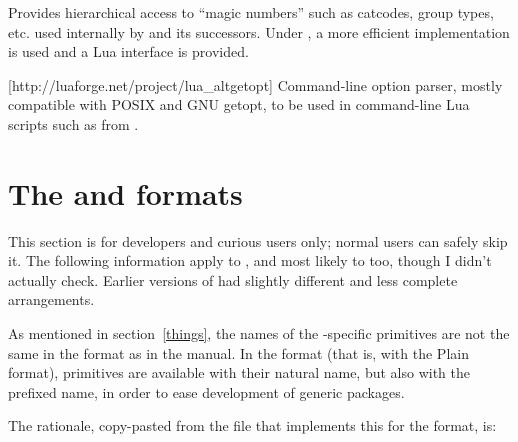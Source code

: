 \documentclass{lltxdoc}
\begin{document}
Provides hierarchical access to ``magic numbers'' such as catcodes, group
types, etc. used internally by \tex and its successors. Under \luatex, a more
efficient implementation is used and a Lua interface is provided.

[http://luaforge.net/project/lua_altgetopt]
Command-line option parser, mostly compatible with POSIX and GNU getopt, to be
used in command-line Lua scripts such as  from
.


\section{The  and  formats}\label{formats}

This section is for developers and curious users only; normal users can safely
skip it. The following information apply to , and most likely to
 too, though I didn't actually check. Earlier versions of \texlive
had slightly different and less complete arrangements.

As mentioned in section~\ref{things}, the names of the \luatex-specific
primitives are not the same in the  format as in the \luatex
manual. In the  format (that is, \luatex with the Plain format),
primitives are available with their natural name, but also with the prefixed
name, in order to ease development of generic packages.

The rationale, copy-pasted from the file  that
implements this for the  format, is:
\end{document}
